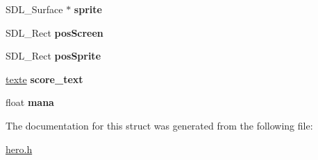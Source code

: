 \begin{DoxyCompactItemize}
S\+D\+L\+\_\+\+Surface $\ast$ {\bfseries sprite}
\item 
\mbox{\label{structpersonne_a850ac56ffff0546effe99c9e8e1ea5be}} 
S\+D\+L\+\_\+\+Rect {\bfseries pos\+Screen}
\item 
\mbox{\label{structpersonne_a2f11102158f4856618d5fc74bf1987ea}} 
S\+D\+L\+\_\+\+Rect {\bfseries pos\+Sprite}
\item 
\mbox{\label{structpersonne_ac5e992a59f81a6f4bb3126f24ffa2ffa}} 
\hyperlink{structtexte}{texte} {\bfseries score\+\_\+text}
\item 
\mbox{\label{structpersonne_a1d5839bf2c6b142fb20a61cd57b09974}} 
float {\bfseries mana}
\end{DoxyCompactItemize}


The documentation for this struct was generated from the following file\+:\begin{DoxyCompactItemize}
\item 
\hyperlink{hero_8h}{hero.\+h}\end{DoxyCompactItemize}
